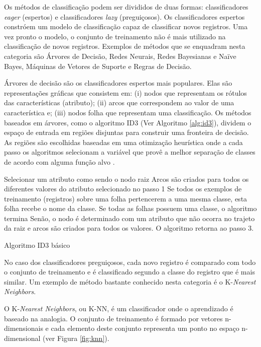 Os métodos de classificação podem ser divididos de duas formas: classificadores \textit{eager} (espertos) e classificadores \textit{lazy} (preguiçosos). Os classificadores espertos constróem um modelo de classificação capaz de classificar novos registros. Uma vez pronto o modelo, o conjunto de treinamento não é mais utilizado na classificação de novos registros. Exemplos de métodos que se enquadram nesta categoria são Árvores de Decisão, Redes Neurais, Redes Bayesianas e Naïve Bayes, Máquinas de Vetores de Suporte e Regras de Decisão.

Árvores de decisão são os classificadores espertos mais populares. Elas são representações gráficas que consistem em: (i) nodos que representam os rótulos das características (atributo); (ii) arcos que correspondem ao valor de uma característica e; (iii) nodos folha que representam uma classificação. Os métodos baseados em árvores, como o algoritmo ID3 (Ver Algoritmo \ref{alg:id3}), dividem o espaço de entrada em regiões disjuntas para construir uma fronteira de decisão. As regiões são escolhidas baseadas em uma otimização heurística onde a cada passo os algoritmos selecionam a variável que provê a melhor separação de classes de acordo com alguma função alvo \cite{vania2018-3}.
        
\begin{algorithm}[!htb]
    \SetAlgoLined
        Selecionar um atributo como sendo o nodo raiz\;
        Arcos são criados para todos os diferentes valores do atributo selecionado no passo 1\;
        Se todos os exemplos de treinamento (registros) sobre uma folha pertencerem a uma mesma classe, esta folha recebe o nome da classe. Se todas as folhas possuem uma classe, o algoritmo termina\;
        Senão, o nodo é determinado com um atributo que não ocorra no trajeto da raiz e arcos são criados para todos os valores. O algoritmo retorna ao passo 3.
    \caption{Algoritmo ID3 básico}
    \label{alg:id3}
\end{algorithm}
    
    
No caso dos classificadores preguiçosos, cada novo registro é comparado com todo o conjunto de treinamento e é classificado segundo a classe do registro que é mais similar. Um exemplo de método bastante conhecido nesta categoria é o K-\textit{Nearest Neighbors}.
    
O K-\textit{Nearest Neighbors}, ou K-NN, é um classificador onde o aprendizado é baseado na analogia. O conjunto de treinamento é formado por vetores n-dimensionais e cada elemento deste conjunto representa um ponto no espaço n-dimensional (ver Figura \ref{fig:knn}).
    
